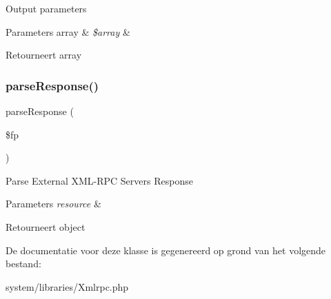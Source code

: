 Output parameters


\begin{DoxyParams}[1]{Parameters}
array & {\em \$array} & \\
\hline
\end{DoxyParams}
\begin{DoxyReturn}{Retourneert}
array 
\end{DoxyReturn}
\mbox{\label{class_x_m_l___r_p_c___message_ab1b93386615fce804baf236bf660a646}} 
\subsubsection{\texorpdfstring{parseResponse()}{parseResponse()}}
{\footnotesize\ttfamily parse\+Response (\begin{DoxyParamCaption}\item[{}]{\$fp }\end{DoxyParamCaption})}

Parse External X\+M\+L-\/\+R\+PC Server\textquotesingle{}s Response


\begin{DoxyParams}{Parameters}
{\em resource} & \\
\hline
\end{DoxyParams}
\begin{DoxyReturn}{Retourneert}
object 
\end{DoxyReturn}


De documentatie voor deze klasse is gegenereerd op grond van het volgende bestand\+:\begin{DoxyCompactItemize}
\item 
system/libraries/Xmlrpc.\+php\end{DoxyCompactItemize}

